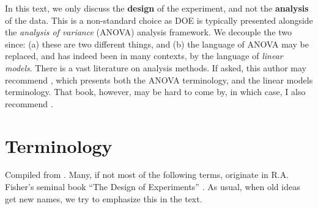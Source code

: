 \begin{remark}
In this text, we only discuss the \textbf{design} of the experiment, and not the \textbf{analysis} of the data.
This is a non-standard choice as DOE is typically presented alongside the \emph{analysis of variance} (ANOVA) analysis framework.
We decouple the two since: 
(a) these are two different things, and 
(b) the language of ANOVA may be replaced, and has indeed been in many contexts, by the language of \emph{linear models}.
There is a vast literature on analysis methods. 
If asked, this author may recommend \cite{hocking_analysis_1985}, which presents both the ANOVA terminology, and the linear models terminology.
That book, however, may be hard to come by, in which case, I also recommend \cite{mason_statistical_2003}.
\end{remark}





\section{Terminology}
Compiled from \cite{mason_statistical_2003}. Many, if not most of the following terms, originate in R.A. Fisher's seminal book ``The Design of Experiments'' \citep{fisher_design_1960}. As usual, when old ideas get new names, we try to emphasize this in the text.



